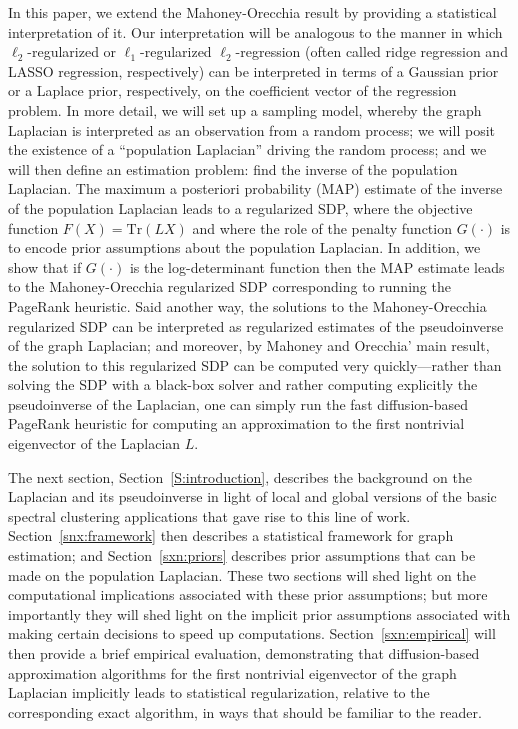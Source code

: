 \documentclass[12pt]{article}
\theoremstyle{plain}
\begin{document}
In this paper, we extend the Mahoney-Orecchia result by providing a
statistical interpretation of it.
Our interpretation will be analogous to the manner in which
$\ell_2$-regularized or $\ell_1$-regularized $\ell_2$-regression (often
called ridge regression and LASSO regression, respectively) can be
interpreted in terms of a Gaussian prior or a Laplace prior, respectively,
on the coefficient vector of the regression problem.
In more detail, we will set up a sampling model, whereby the graph Laplacian
is interpreted as an observation from a random process; we will posit the
existence of a ``population Laplacian'' driving the random process; and we
will then define an estimation problem: find the inverse of the population
Laplacian.
The maximum a posteriori probability (MAP) estimate of the inverse of the
population Laplacian leads to a regularized SDP, where the objective
function $F(X)=\mathrm{Tr}(L X)$ and where the role of the penalty function
$G(\cdot)$ is to encode prior assumptions about the population Laplacian.
In addition, we show that if $G(\cdot)$ is the log-determinant function then
the MAP estimate leads to the Mahoney-Orecchia regularized SDP 
corresponding to running the PageRank heuristic.
Said another way, the solutions to the Mahoney-Orecchia regularized SDP can 
be interpreted as regularized estimates of the pseudoinverse of the graph 
Laplacian; and moreover, by Mahoney and Orecchia' main result, the solution 
to this regularized SDP can be computed very quickly---rather than solving 
the SDP with a black-box solver and rather computing explicitly the 
pseudoinverse of the Laplacian, one can simply run the fast diffusion-based 
PageRank heuristic for computing an approximation to the first nontrivial 
eigenvector of the Laplacian $L$.

The next section, Section~\ref{S:introduction}, describes the background on
the Laplacian and its pseudoinverse in light of local and global versions of
the basic spectral clustering applications that gave rise to this line of
work.
Section~\ref{snx:framework} then describes a statistical framework for graph
estimation; and Section~\ref{sxn:priors} describes prior assumptions that
can be made on the population Laplacian.
These two sections will shed light on the computational implications
associated with these prior assumptions; but more importantly they will shed
light on the implicit prior assumptions associated with making certain
decisions to speed up computations.
Section~\ref{sxn:empirical} will then provide a brief empirical evaluation,
demonstrating that diffusion-based approximation algorithms for the first 
nontrivial eigenvector of the graph Laplacian implicitly leads to 
statistical regularization, relative to the corresponding exact algorithm, 
in ways that should be familiar to the reader.
\end{document}
